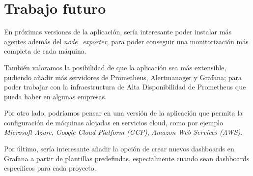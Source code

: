 \section*{Trabajo futuro}

En próximas versiones de la aplicación, sería interesante poder instalar más agentes además del \textit{node\_exporter}, para poder conseguir una monitorización más completa de cada máquina. 

También valoramos la posibilidad de que la aplicación sea más extensible, pudiendo añadir más servidores de Prometheus, Alertmanager y Grafana; para poder trabajar con la infraestructura de Alta Disponibilidad de Prometheus que pueda haber en algunas empresas.

Por otro lado, podríamos pensar en una versión de la aplicación que permita la configuración de máquinas alojadas en servicios cloud, como por ejemplo \textit{Microsoft Azure}, \textit{Google Cloud Platform (GCP)}, \textit{Amazon Web Services (AWS)}.

Por último, sería interesante añadir la opción de crear nuevos dashboards en Grafana a partir de plantillas predefindas, especialmente cuando sean dashboards específicos para cada proyecto. 